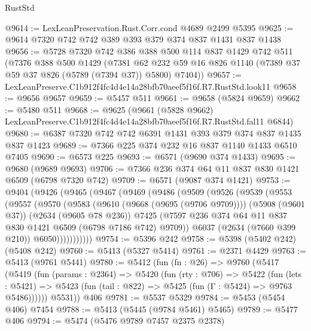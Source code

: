 \begin{lexlean}{RustStd}
\begin{coremodule}
@9614 := LexLeanPreservation.Rust.Corr.cond @4689 @2499 @5395
@9625 := @9614 @7320 @742 @742 @389 @393 @379 @374 @837 @1431 @837 @1438
@9656 := @5728
    @7320
    @742
    @386
    @388
    @500
    @114
    @837
    @1429
    @742
    @511
    (@7376
      @388
      @500
      @1429
      (@7381 @62 @232 @59 @16 @826 @1140 (@7389 @37 @59 @37 @826 (@5789 (@7394 @37)) @5800) @7404))
@9657 := LexLeanPreserve.C1b912f4fc4d4e14a28bfb70aeef5f16f.R7.RustStd.look11
@9658 := @9656 @9657
@9659 := @5457 @511
@9661 := @9658 (@5824 @9659)
@9662 := @5480 @511
@9668 := @9625
    (@9661 (@5828 @9662) LexLeanPreserve.C1b912f4fc4d4e14a28bfb70aeef5f16f.R7.RustStd.fal11 @6844)
@9680 := @6387 @7320 @742 @742 @6391 @1431 @393 @379 @374 @837 @1435 @837 @1423
@9689 := @7366 @225 @374 @232 @16 @837 @1140 @1433 @6510 @7405
@9690 := @6573 @225
@9693 := @6571 (@9690 @374 @1433)
@9695 := @9680 (@9689 @9693)
@9706 := @7366 @236 @374 @64 @11 @837 @830 @1421 @6509 (@6798 @7320 @742)
@9709 := @6571 (@9087 @374 @1421)
@9753 := @9404
    (@9426
      (@9465
        (@9467
          (@9469
            (@9486
              (@9509
                (@9526
                  (@9539
                    (@9553
                      (@9557
                        (@9570
                          (@9583
                            (@9610 (@9668 (@9695 (@9706 @9709))))
                            (@5908 (@9601 @37))
                            (@2634 (@9605 @78 @236))
                            @7425
                            (@7597
                              @236
                              @374
                              @64
                              @11
                              @837
                              @830
                              @1421
                              @6509
                              (@6798 @7186 @742)
                              @9709))
                          @6037
                          (@2634 (@7660 @399 @210))
                          @6050)))))))))))
@9754 := @5396 @242
@9758 := @5398 (@5402 @242) (@5408 @242)
@9760 := @5413 (@5327 @5414)
@9761 := @2371 @4429
@9763 := @5413 (@9761 @5441)
@9780 := @5412
    (fun (fn : @26) =>
    @9760
      (@5417
        (@5419
          (fun (params : @2364) =>
          @5420
            (fun (rty : @706) =>
            @5422
              (fun (lets : @5421) =>
              @5423 (fun (tail : @822) => @5425 (fun (Γ : @5424) => @9763 @5486))))))
        @5531))
    @406
@9781 := @5537 @5329
@9784 := @5453 (@5454 @406) @7454
@9788 := @5413 (@5445 (@9784 @5461) @5465)
@9789 := @5477 @406
@9794 := @5474 (@5476 @9789 @7457 @2375 @2378)

\end{coremodule}
\end{lexlean}

